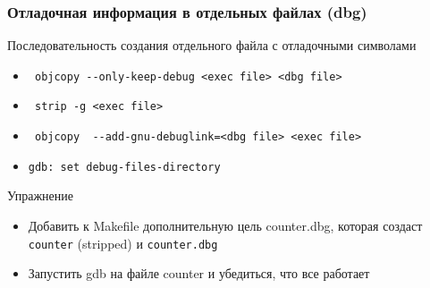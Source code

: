 \begin{frame}[fragile]
  \frametitle{Отладочная информация в отдельных файлах (dbg)}
  \begin{center}
    Последовательность создания отдельного файла с отладочными символами
  \end{center}
  \begin{itemize}
    \item \verb+ objcopy --only-keep-debug <exec file> <dbg file>+
    \item \verb+ strip -g <exec file>+
    \item \verb+ objcopy  --add-gnu-debuglink=<dbg file> <exec file> + 
    \item \texttt{gdb: set debug-files-directory}
  \end{itemize} 
\pause
  \begin{center}
   Упражнение
  \end{center}
  \begin{itemize}
    \item Добавить к Makefile дополнительную цель counter.dbg, которая создаст \texttt{counter} (stripped) и \texttt{counter.dbg}
    \item Запустить gdb на файле counter и убедиться, что все работает
  \end{itemize}
\end{frame}  



